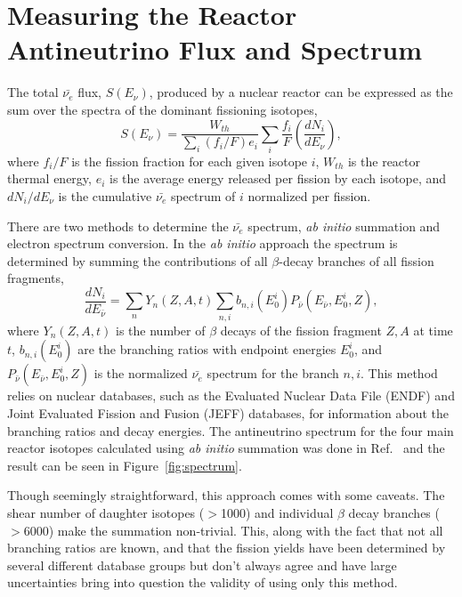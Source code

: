 \section{Measuring the Reactor Antineutrino Flux and Spectrum}

The total $\bar{\nu_{e}}$ flux, $S(E_\nu)$, produced by a nuclear reactor can be expressed as the sum over the spectra of the dominant fissioning isotopes,
\begin{equation}
	S(E_\nu) = \frac{W_{th}}{\sum_{i}(f_i/F)e_i}\sum_{i}\frac{f_i}{F}\left(\frac{dN_i}{dE_\nu}\right) ,
\end{equation}
where $f_i/F$ is the fission fraction for each given isotope $i$, $W_{th}$ is the reactor thermal energy, $e_i$ is the 
average energy released per fission by each isotope, and $dN_i/dE_\nu$ is the cumulative $\bar{\nu_e}$ spectrum of $i$ normalized per fission.

There are two methods to determine the $\bar{\nu_e}$ spectrum, \textit{ab initio} summation and electron spectrum conversion.
In the \textit{ab initio} approach the spectrum is determined by summing the contributions of all $\beta$-decay branches of all fission fragments,
\begin{equation}
	\frac{dN_i}{dE_{\bar{\nu}}} =  \sum_{n}Y_n(Z,A,t)\sum_{n,i}b_{n,i}(E^i_0)P_{\bar{\nu}}(E_{\bar{\nu}},E^i_0,Z) ,
\end{equation}
where $Y_n(Z,A,t)$ is the number of $\beta$ decays of the fission fragment $Z, A$ at time $t$, $b_{n,i}(E^i_0)$ are the branching ratios with endpoint energies $E^i_0$, and $P_{\bar{\nu}}(E_{\bar{\nu}},E^i_0,Z)$ is the normalized $\bar{\nu_e}$ spectrum for the branch $n, i$.
This method relies on nuclear databases, such as the Evaluated Nuclear Data File (ENDF) and Joint Evaluated Fission and Fusion (JEFF) databases, for information about the branching ratios and decay energies. 
The antineutrino spectrum for the four main reactor isotopes calculated using \textit{ab initio} summation was done in Ref.~\cite{HayesVogel} and the result can be seen in Figure~\ref{fig:spectrum}. 

Though seemingly straightforward, this approach comes with some caveats.
The shear number of daughter isotopes ($>$1000) and individual $\beta$ decay branches ($>$6000) make the summation non-trivial.
This, along with the fact that not all branching ratios are known, and that the fission yields have been determined by several different database groups but don't always agree and have large uncertainties bring into question the validity of using only this method. 

